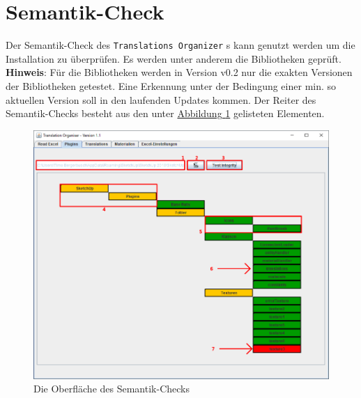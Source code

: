 \documentclass{book}
\newcommand{\assisttool}{\texttt{Translations Organizer}\xspace}
\newcommand{\hinweis}[1]{\newline \textbf{Hinweis}: #1 \newline}
\begin{document}
		\section{Semantik-Check}\label{semantic check}
			Der Semantik-Check des \assisttool s kann genutzt werden um die Installation zu überprüfen. Es werden unter anderem die Bibliotheken geprüft. 
			\hinweis{Für die Bibliotheken werden in Version v0.2 nur die exakten Versionen der Bibliotheken getestet. Eine Erkennung unter der Bedingung einer min. so aktuellen Version soll in den laufenden Updates kommen.}
			Der Reiter des Semantik-Checks besteht aus den unter \hyperref[fig:semantik check]{Abbildung \ref{fig:semantik check}} gelisteten Elementen.				
			
			\begin{figure}
				\centering
				\includegraphics[scale=0.48]{pics/assisttool/semantik-check.png}
				\caption{Die Oberfläche des Semantik-Checks}
				\label{fig:semantik check}
			\end{figure}
		
\end{document}
